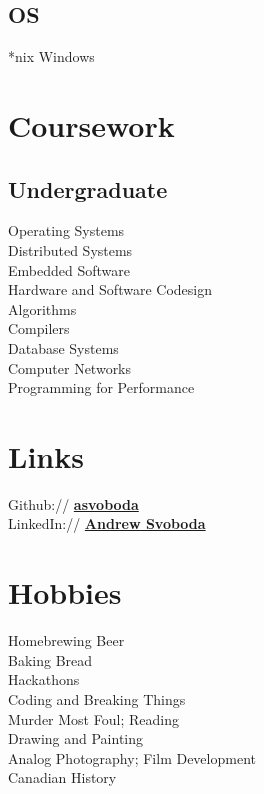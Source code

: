 \documentclass[letterpaper]{deedy-resume} %
\begin{document}
\begin{minipage}[t]{0.33\textwidth}
\sectionspace %

\subsection{OS}
*nix \textbullet{} Windows 


\section{Coursework}

\subsection{Undergraduate}

Operating Systems \\
Distributed Systems \\
Embedded Software \\
Hardware and Software Codesign \\
Algorithms \\
Compilers \\
Database Systems \\
Computer Networks \\
Programming for Performance 


\section{Links} 

Github:// \href{https://github.com/asvoboda}{\bf asvoboda} \\
LinkedIn:// \href{https://ca.linkedin.com/pub/andrew-svoboda/80/645/667}{\bf Andrew Svoboda}


\section{Hobbies}

Homebrewing Beer \\
Baking Bread \\
Hackathons \\
Coding and Breaking Things \\
Murder Most Foul; Reading \\
Drawing and Painting \\
Analog Photography; Film Development \\
Canadian History

\sectionspace %


\end{minipage} %
\end{document}
